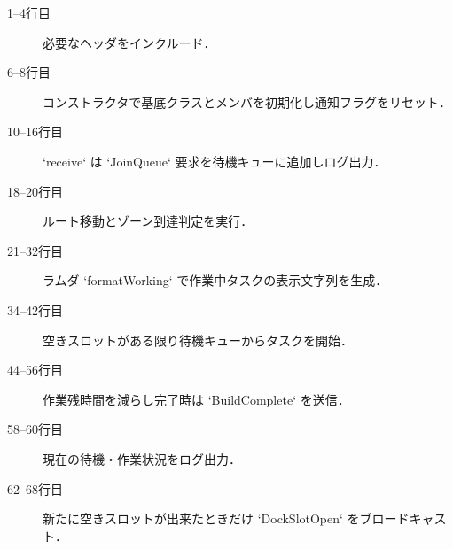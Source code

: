 \documentclass[10pt,letterpaper]{jsarticle}
\begin{document}
\begin{description}
  \item[1--4行目] 必要なヘッダをインクルード．
  \item[6--8行目] コンストラクタで基底クラスとメンバを初期化し通知フラグをリセット．
  \item[10--16行目] `receive` は `JoinQueue` 要求を待機キューに追加しログ出力．
  \item[18--20行目] ルート移動とゾーン到達判定を実行．
  \item[21--32行目] ラムダ `formatWorking` で作業中タスクの表示文字列を生成．
  \item[34--42行目] 空きスロットがある限り待機キューからタスクを開始．
  \item[44--56行目] 作業残時間を減らし完了時は `BuildComplete` を送信．
  \item[58--60行目] 現在の待機・作業状況をログ出力．
  \item[62--68行目] 新たに空きスロットが出来たときだけ `DockSlotOpen` をブロードキャスト．
\end{description}
\end{document}
